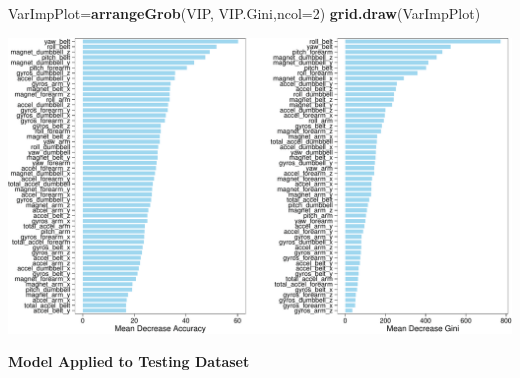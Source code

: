 \documentclass[]{article}
\newenvironment{Shaded}{\begin{snugshade}}{\end{snugshade}}
\newcommand{\KeywordTok}[1]{\textcolor[rgb]{0.13,0.29,0.53}{\textbf{{#1}}}}
\newcommand{\DataTypeTok}[1]{\textcolor[rgb]{0.13,0.29,0.53}{{#1}}}
\newcommand{\DecValTok}[1]{\textcolor[rgb]{0.00,0.00,0.81}{{#1}}}
\newcommand{\StringTok}[1]{\textcolor[rgb]{0.31,0.60,0.02}{{#1}}}
\newcommand{\NormalTok}[1]{{#1}}
\begin{document}
\begin{Shaded}
\begin{Highlighting}[]
\NormalTok{VarImpPlot=}\KeywordTok{arrangeGrob}\NormalTok{(VIP, VIP.Gini,}\DataTypeTok{ncol=}\DecValTok{2}\NormalTok{)}
\KeywordTok{grid.draw}\NormalTok{(VarImpPlot)}
\end{Highlighting}
\end{Shaded}

\begin{center}\includegraphics{MLproject_files/figure-latex/unnamed-chunk-5-1} \end{center}

\textbf{Model Applied to Testing Dataset}

\begin{Shaded}
\end{Shaded}
\end{document}
